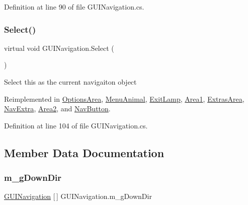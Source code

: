 Definition at line 90 of file G\+U\+I\+Navigation.\+cs.

\mbox{\label{class_g_u_i_navigation_a4c40fc7986ac35247bc8f77c615e7847}} 
\subsubsection{\texorpdfstring{Select()}{Select()}}
{\footnotesize\ttfamily virtual void G\+U\+I\+Navigation.\+Select (\begin{DoxyParamCaption}{ }\end{DoxyParamCaption})\hspace{0.3cm}{\ttfamily [virtual]}}



Select this as the current navigaiton object 



Reimplemented in \mbox{\hyperlink{class_options_area_a2dc4be3a6a17378055632ac3d0c124e7}{Options\+Area}}, \mbox{\hyperlink{class_menu_animal_ae910dac4feb11d1d3c911bd1823075cc}{Menu\+Animal}}, \mbox{\hyperlink{class_exit_lamp_af51dbc04e07910eaf73808834630fdd4}{Exit\+Lamp}}, \mbox{\hyperlink{class_area1_a007f43862f61bfad75a3df88ed84f5e1}{Area1}}, \mbox{\hyperlink{class_extras_area_a84802701ddb9dd90a6121aee3f96d940}{Extras\+Area}}, \mbox{\hyperlink{class_nav_extra_abebcfc80eaf380a014c7865dc7a7bf8e}{Nav\+Extra}}, \mbox{\hyperlink{class_area2_a099229de36fc80039e1f8ea8d3dca78b}{Area2}}, and \mbox{\hyperlink{class_nav_button_ac6d38f6d6b51c27c7b6a67d9efcfcb8e}{Nav\+Button}}.



Definition at line 104 of file G\+U\+I\+Navigation.\+cs.



\subsection{Member Data Documentation}
\mbox{\label{class_g_u_i_navigation_ac3372b8affb924a8468bd927749863e8}} 
\subsubsection{\texorpdfstring{m\+\_\+g\+Down\+Dir}{m\_gDownDir}}
{\footnotesize\ttfamily \mbox{\hyperlink{class_g_u_i_navigation}{G\+U\+I\+Navigation}} \mbox{[}$\,$\mbox{]} G\+U\+I\+Navigation.\+m\+\_\+g\+Down\+Dir}



